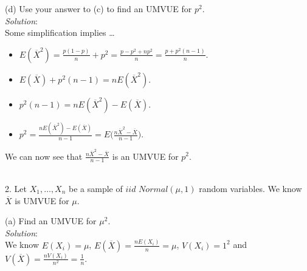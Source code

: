 \documentclass[12pt]{article}
\newcommand{\XB}{\color{black}}
\newcommand{\XBB}{\color{blue}}
\newcommand{\ds}{\displaystyle}
\begin{document}
(d) Use your answer to (c) to find an UMVUE for $ p^{2} $.
\vspace{2.5mm} \\
\textit{Solution}:
\vspace{2.5mm} \\

\noindent
Some simplification implies \dots

\begin{itemize}
    \item $ \ds E(\overline{X}^{2}) = \frac{p(1-p)}{n} + p^{2} = \frac{p - p^{2} + np^{2}}{n} = \frac{p + p^{2}(n - 1)}{n} $.
    \item $ \ds E(\overline{X}) + p^{2}(n - 1) = nE(\overline{X}^{2}) $.
    \item $ \ds p^{2}(n-1) = nE(\overline{X}^{2}) - E(\overline{X}) $.
    \item $ \ds p^{2} = \frac{nE(\overline{X}^{2}) - E(\overline{X})}{n - 1} = E \Biggl( \frac{n\overline{X}^{2} - \overline{X}}{n - 1} \Biggr) $.
\end{itemize}

\noindent
We can now see that $ \ds \frac{n\overline{X}^{2} - \overline{X}}{n - 1} $ is an UMVUE for $ p^{2} $. \\

\vspace{2.5mm}

\newpage
\XBB\hrulefill\XB \\

2. Let $ X_{1},\dots,X_{n} $ be a sample of $ iid $ $ Normal(\mu, 1) $ random variables. We know $ \overline{X} $ is UMVUE for $ \mu $.

\XBB\hrulefill\XB
\vspace{5mm}

(a) Find an UMVUE for $\mu^{2} $.
\vspace{2.5mm} \\
\textit{Solution}:
\vspace{2.5mm} \\

\noindent
We know $ \ds E(X_{i}) = \mu $, $ \ds E(\overline{X}) = \frac{nE(X_{i})}{n} = \mu $, $ \ds V(X_{i}) = 1^{2} $ and $ \ds V(\overline{X}) = \frac{nV(X_{i})}{n^{2}} = \frac{1}{n} $. \\
\end{document}
